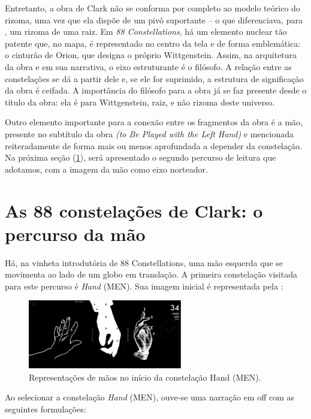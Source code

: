 \documentclass[portuguese]{textolivre}
\begin{document}
Entretanto, a obra de Clark não se conforma por completo ao modelo teórico do rizoma, uma vez que ela dispõe de um pivô suportante – o que diferenciava, para \textcite{deleuze1997}, um rizoma de uma raiz. Em \emph{88 Constellations}, há um elemento nuclear tão patente que, no mapa, é representado no centro da tela e de forma emblemática: o cinturão de Orion, que designa o próprio Wittgenstein. Assim, na arquitetura da obra e em sua narrativa, o eixo estruturante é o filósofo. A relação entre as constelações se dá a partir dele e, se ele for suprimido, a estrutura de significação da obra é ceifada. A importância do filósofo para a obra já se faz presente desde o título da obra: ela é para Wittgenstein, raiz, e não rizoma deste universo. 

Outro elemento importante para a conexão entre os fragmentos da obra é a mão, presente no subtítulo da obra \emph{(to Be Played with the Left Hand)} e mencionada reiteradamente de forma mais ou menos aprofundada a depender da constelação. Na próxima seção (\ref{sec3}), será apresentado o segundo percurso de leitura que adotamos, com a imagem da mão como eixo norteador. 

\section{As 88 constelações de Clark: o percurso da mão}\label{sec3}
Há, na vinheta introdutória de 88 Constellations, uma mão esquerda que se movimenta ao lado de um globo em translação. A primeira constelação visitada para este percurso é \emph{Hand} (MEN). Sua imagem inicial é representada pela :  

\begin{figure}[htbp]
 \centering
 \includegraphics[width=0.6\textwidth]{Fig12[1].jpg}
 \caption{Representações de mãos no início da constelação Hand (MEN).}
 \label{fig12}
\end{figure}

Ao selecionar a constelação \emph{Hand} (MEN), ouve-se uma narração em off com as seguintes formulações:  
\end{document}
